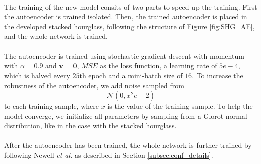 \documentclass[./main.tex]{subfiles}
\begin{document}
\\
The training of the new model consits of two parts to speed up the training. First the autoencoder is trained isolated. Then, the trained autoencoder is placed in the developed stacked hourglass, following the structure of Figure \ref{fig:SHG_AE}, and the whole network is trained.
\\
\\
The autoencoder is trained using stochastic gradient descent with momentum with $\alpha = 0.9$ and $\bm{v} = \bm{0}$, $MSE$ as the loss function, a learning rate of $5e-4$, which is halved every $25$th epoch and a mini-batch size of $16$. To increase the robustness of the autoencoder, we add noise sampled from
$$\mathcal{N} \left(0, x^2e-2 \right)$$
to each training sample, where $x$ is the value of the training sample. To help the model converge, we initialize all parameters by sampling from a Glorot normal distribution, like in the case with the stacked hourglass.
\\
\\
After the autoencoder has been trained, the whole network is further trained by following Newell \textit{et al.} \cite{Newell} as described in Section \ref{subsec:conf_details}.
\end{document}
